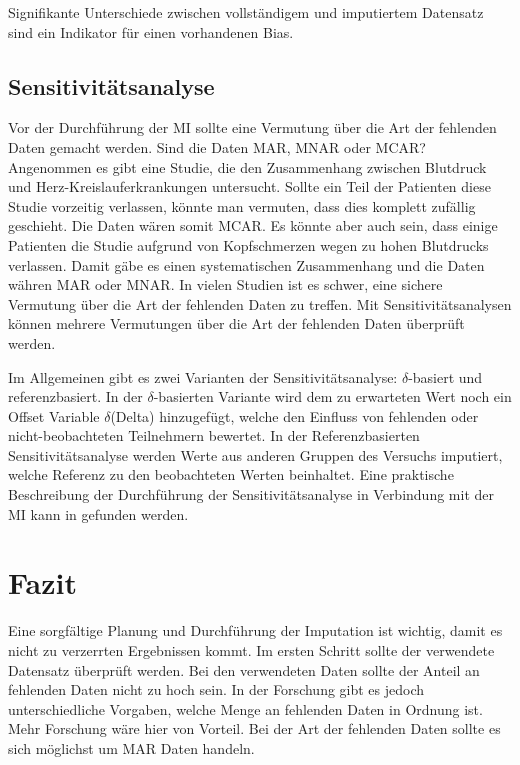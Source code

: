 Signifikante Unterschiede zwischen vollständigem und imputiertem Datensatz sind ein Indikator für einen vorhandenen Bias.

\subsection{Sensitivitätsanalyse}

Vor der Durchführung der MI sollte eine Vermutung über die Art der fehlenden Daten gemacht werden. Sind die Daten MAR, MNAR 
oder MCAR? Angenommen es gibt eine Studie, die den Zusammenhang zwischen Blutdruck und Herz-Kreislauferkrankungen untersucht. 
Sollte ein Teil der Patienten diese Studie vorzeitig verlassen, könnte man vermuten, dass dies komplett zufällig geschieht. 
Die Daten wären somit MCAR. Es könnte aber auch sein, dass einige Patienten die Studie aufgrund von Kopfschmerzen wegen zu 
hohen Blutdrucks verlassen. Damit gäbe es einen systematischen Zusammenhang und die Daten währen MAR oder MNAR. In vielen 
Studien ist es schwer, eine sichere Vermutung über die Art der fehlenden Daten zu treffen. Mit Sensitivitätsanalysen können 
mehrere Vermutungen über die Art der fehlenden Daten überprüft werden. \autocite[2815]{Cro2020}

Im Allgemeinen gibt es zwei Varianten der Sensitivitätsanalyse: $\delta$-basiert und referenzbasiert. In der $\delta$-basierten Variante 
wird dem zu erwarteten Wert noch ein Offset Variable $\delta$(Delta) hinzugefügt, welche den Einfluss von 
fehlenden oder nicht-beobachteten Teilnehmern bewertet.  In der Referenzbasierten Sensitivitätsanalyse werden Werte aus 
anderen Gruppen des Versuchs imputiert, welche Referenz zu den beobachteten Werten beinhaltet. \autocite[2815]{Cro2020} 
Eine praktische Beschreibung der Durchführung der Sensitivitätsanalyse in Verbindung mit der MI kann in 
\textcite[]{Cro2020} gefunden werden.

\section{Fazit}

Eine sorgfältige Planung und Durchführung der Imputation ist wichtig, damit es nicht zu verzerrten Ergebnissen kommt. 
Im ersten Schritt sollte der verwendete Datensatz überprüft werden. Bei den verwendeten Daten sollte der Anteil an fehlenden 
Daten nicht zu hoch sein. In der Forschung gibt es jedoch unterschiedliche Vorgaben, welche Menge an fehlenden Daten in 
Ordnung ist. Mehr Forschung wäre hier von Vorteil. Bei der Art der fehlenden Daten sollte es sich möglichst um MAR Daten 
handeln. 

